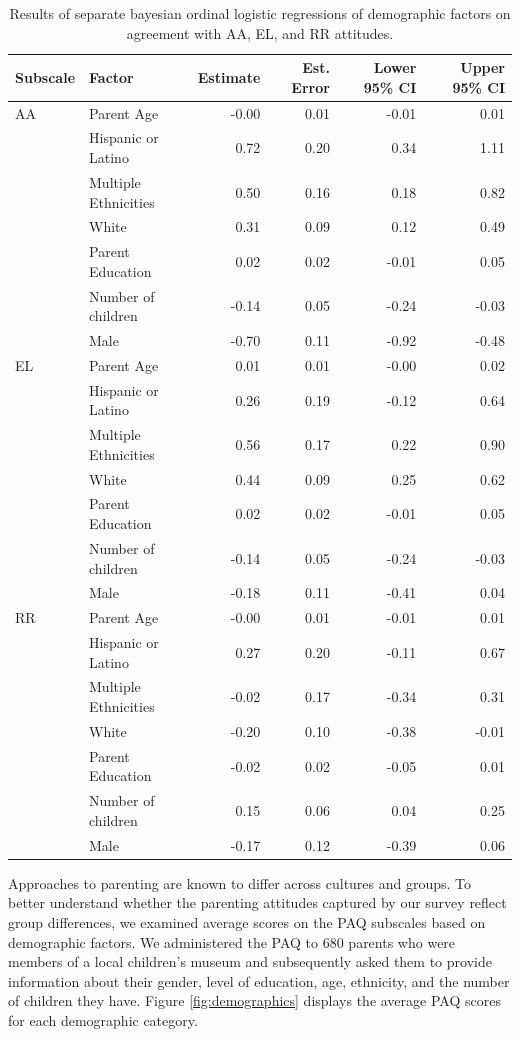 \documentclass[floatsintext,man]{apa6}
\theoremstyle{definition}
\theoremstyle{definition}
\theoremstyle{definition}
\theoremstyle{remark}
\begin{document}
\begin{table}[H]
\centering
\caption{Results of separate bayesian ordinal logistic regressions of demographic factors on agreement with AA, EL, and RR attitudes.} 
\label{tab:demo}
\begin{tabular}{llrrrr}
  \hline
Subscale & Factor & Estimate & Est. Error & Lower 95\% CI & Upper 95\% CI \\ 
  \hline
AA & Parent Age & -0.00 & 0.01 & -0.01 & 0.01 \\ 
   & Hispanic or Latino & 0.72 & 0.20 & 0.34 & 1.11 \\ 
   & Multiple Ethnicities & 0.50 & 0.16 & 0.18 & 0.82 \\ 
   & White & 0.31 & 0.09 & 0.12 & 0.49 \\ 
   & Parent Education & 0.02 & 0.02 & -0.01 & 0.05 \\ 
   & Number of children & -0.14 & 0.05 & -0.24 & -0.03 \\ 
   & Male & -0.70 & 0.11 & -0.92 & -0.48 \\ 
   \hline
EL & Parent Age & 0.01 & 0.01 & -0.00 & 0.02 \\ 
   & Hispanic or Latino & 0.26 & 0.19 & -0.12 & 0.64 \\ 
   & Multiple Ethnicities & 0.56 & 0.17 & 0.22 & 0.90 \\ 
   & White & 0.44 & 0.09 & 0.25 & 0.62 \\ 
   & Parent Education & 0.02 & 0.02 & -0.01 & 0.05 \\ 
   & Number of children & -0.14 & 0.05 & -0.24 & -0.03 \\ 
   & Male & -0.18 & 0.11 & -0.41 & 0.04 \\ 
   \hline
RR & Parent Age & -0.00 & 0.01 & -0.01 & 0.01 \\ 
   & Hispanic or Latino & 0.27 & 0.20 & -0.11 & 0.67 \\ 
   & Multiple Ethnicities & -0.02 & 0.17 & -0.34 & 0.31 \\ 
   & White & -0.20 & 0.10 & -0.38 & -0.01 \\ 
   & Parent Education & -0.02 & 0.02 & -0.05 & 0.01 \\ 
   & Number of children & 0.15 & 0.06 & 0.04 & 0.25 \\ 
   & Male & -0.17 & 0.12 & -0.39 & 0.06 \\ 
   \hline
\end{tabular}
\end{table}

Approaches to parenting are known to differ across cultures and groups.
To better understand whether the parenting attitudes captured by our
survey reflect group differences, we examined average scores on the PAQ
subscales based on demographic factors. We administered the PAQ to 680
parents who were members of a local children's museum and subsequently
asked them to provide information about their gender, level of
education, age, ethnicity, and the number of children they have. Figure
\ref{fig:demographics} displays the average PAQ scores for each
demographic category.
\end{document}
